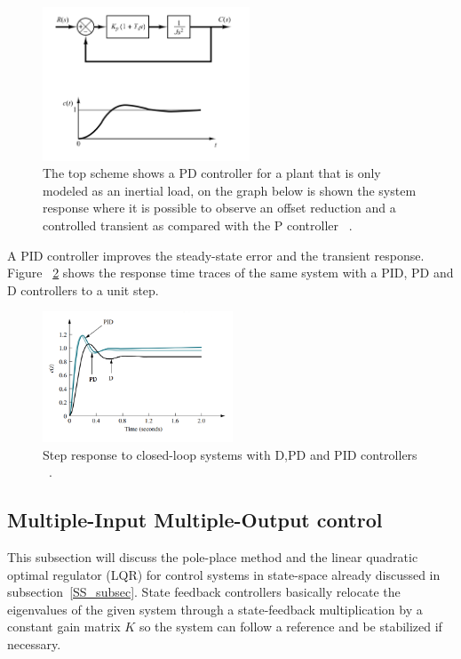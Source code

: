 \begin{figure}[h]
	\centering
	\includegraphics[width=0.55\textwidth]{Chp2/propderivgain.png}
	\caption{ The top scheme shows a PD controller for a  plant that is only modeled as an inertial load, on the graph below is shown the system response where it is possible to observe an offset reduction and a controlled transient as compared with the P controller ~\cite[Chapter~ 5]{Ogata2009}. \label{propderGain}}
\end{figure}

A PID controller improves the steady-state error and the transient response. Figure ~\ref{PID} shows the response time traces  of the same system with a PID, PD and D controllers to a unit step.
\smallskip



\begin{figure}[h]
	\centering
	\includegraphics[width=0.505\textwidth]{Chp2/PID_comp.png}
	\caption{ Step response to closed-loop systems with D,PD and PID controllers ~\cite[Chapter~ 9]{Nise}. \label{PID}}
\end{figure}

\subsection{Multiple-Input Multiple-Output control}
\label{MIMO_sec}
This subsection will discuss the pole-place method and the linear quadratic optimal regulator (LQR) for control systems in state-space already discussed in subsection~\ref{SS_subsec}.  State feedback controllers basically relocate the eigenvalues of the given system through a state-feedback multiplication by a constant gain matrix $K$ so the system can follow a reference and be stabilized if necessary.
 \smallskip
 
